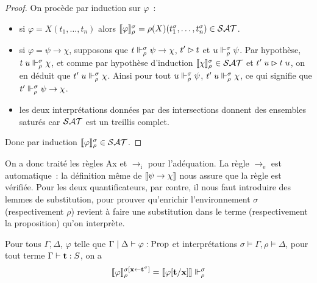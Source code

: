 \documentclass{article}
\begin{document}
\begin{proof}
  On procède par induction sur $\varphi$~:
  \begin{itemize}
  \item si $\varphi = X(t_1,\ldots,t_n)$ alors $\llbracket \varphi \rrbracket_\rho^\sigma=\rho(X)(t_1^\sigma,\ldots,t_n^\sigma)\in \mathcal {SAT}$.
  \item si $\varphi = \psi \to \chi$, supposons que $t\Vdash_\rho^\sigma \psi \to \chi$, $t'\rhd t$ et $u\Vdash_\rho^\sigma\psi$. Par hypothèse, $t\;u\Vdash_\rho^\sigma \chi$, et comme par hypothèse d'induction $\llbracket \chi \rrbracket_\rho^\sigma\in\mathcal {SAT}$ et $t'\;u\rhd t\;u$, on en déduit que $t'\;u\Vdash_\rho^\sigma \chi$. Ainsi pour tout $u\Vdash_\rho^\sigma\psi$, $t'\;u\Vdash_\rho^\sigma\chi$, ce qui signifie que $t'\Vdash_\rho^\sigma\psi\to\chi$.
  \item les deux interprétations données par des intersections donnent des ensembles saturés car $\mathcal {SAT}$ est un treillis complet.
  \end{itemize}
  Donc par induction $\llbracket \varphi \rrbracket_\rho^\sigma\in\mathcal {SAT}$.
\end{proof}

On a donc traité les règles Ax et $\to_\mathrm i$ pour l'adéquation. La règle $\to_\mathrm e$ est automatique~: la définition même de $\llbracket \psi\to\chi \rrbracket$ nous assure que la règle est vérifiée. Pour les deux quantificateurs, par contre, il nous faut introduire des lemmes de substitution, pour prouver qu'enrichir l'environnement $\sigma$ (respectivement $\rho$) revient à faire une substitution dans le terme (respectivement la proposition) qu'on interprète.

\begin{lem}\label{lem.subst.1}
  Pour tous $\Gamma,\Delta$, $\varphi$ telle que $\Gamma\mid\Delta\vdash \varphi : \mathrm{Prop}$ et interprétations $\sigma\models \Gamma, \rho \models \Delta$, pour tout terme $\Gamma\vdash \mathbf{t} : S$, on a
  \[\llbracket \varphi \rrbracket_\rho^{\sigma[\mathbf{x} \leftarrow \mathbf{t}^\sigma]}= \llbracket \varphi[\mathbf{t}/\mathbf{x}] \rrbracket\Vdash_\rho^\sigma\]
\end{lem}
\end{document}

